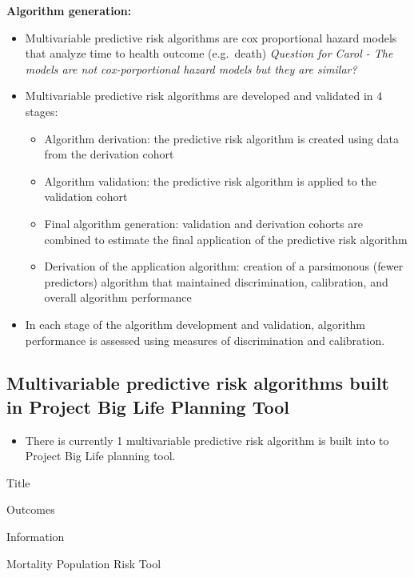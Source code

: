 \documentclass[]{book}
\providecommand{\tightlist}{%
  \setlength{\itemsep}{0pt}\setlength{\parskip}{0pt}}
\begin{document}
\textbf{Algorithm generation:}

\begin{itemize}
\item
  Multivariable predictive risk algorithms are cox proportional hazard
  models that analyze time to health outcome (e.g.~death) \emph{Question
  for Carol - The models are not cox-porportional hazard models but they
  are similar?}
\item
  Multivariable predictive risk algorithms are developed and validated
  in 4 stages:

  \begin{itemize}
  \tightlist
  \item
    Algorithm derivation: the predictive risk algorithm is created using
    data from the derivation cohort
  \item
    Algorithm validation: the predictive risk algorithm is applied to
    the validation cohort
  \item
    Final algorithm generation: validation and derivation cohorts are
    combined to estimate the final application of the predictive risk
    algorithm
  \item
    Derivation of the application algorithm: creation of a parsimonous
    (fewer predictors) algorithm that maintained discrimination,
    calibration, and overall algorithm performance
  \end{itemize}
\item
  In each stage of the algorithm development and validation, algorithm
  performance is assessed using measures of discrimination and
  calibration.
\end{itemize}

\subsection{Multivariable predictive risk algorithms built in Project
Big Life Planning
Tool}\label{multivariable-predictive-risk-algorithms-built-in-project-big-life-planning-tool}

\begin{itemize}
\tightlist
\item
  There is currently 1 multivariable predictive risk algorithm is built
  into to Project Big Life planning tool.
\end{itemize}

Title

Outcomes

Information

Mortality Population Risk Tool
\end{document}
